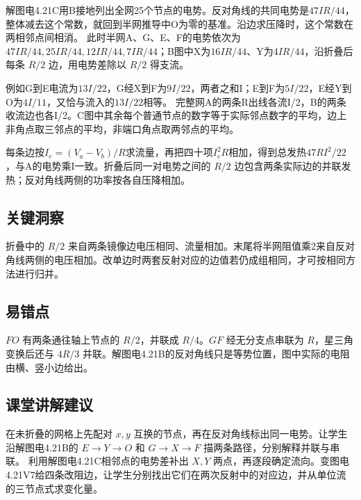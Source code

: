 \documentclass[UTF8,fontset=fandol,a4paper,11pt]{ctexart}
\begin{document}
解图电4.21C用B接地列出全网25个节点的电势。反对角线的共同电势是$47IR/44$，整体减去这个常数，就回到半网推导中O为零的基准。沿边求压降时，这个常数在两相邻点间相消。
此时半网A、G、E、F的电势依次为$47IR/44,25IR/44,12IR/44,7IR/44$；B图中X为$16IR/44$、Y为$4IR/44$，沿折叠后每条 $R/2$ 边，用电势差除以 $R/2$ 得支流。

例如G到E电流为$13I/22$，G经X到F为$9I/22$，两者之和I；E到F为$5I/22$，E经Y到O为$4I/11$，又恰与流入的$13I/22$相等。
完整网A的两条R出线各流I/2，B的两条收流边也各I/2。C图中其余每个普通节点的数字等于实际邻点数字的平均，边上非角点取三邻点的平均，非端口角点取两邻点的平均。

每条边按$I_e=(V_a-V_b)/R$求流量，再把四十项$I_e^2R$相加，得到总发热$47RI^2/22$，与A的电势乘I一致。折叠后同一对电势之间的 $R/2$ 边包含两条实际边的并联发热；反对角线两侧的功率按各自压降相加。




\subsection*{关键洞察}

折叠中的 $R/2$ 来自两条镜像边电压相同、流量相加。末尾将半网阻值乘2来自反对角线两侧的电压相加。改单边时两套反射对应的边值若仍成组相同，才可按相同方法进行归并。



\subsection*{易错点}

$FO$ 有两条通往轴上节点的 $R/2$，并联成 $R/4$。$GF$ 经无分支点串联为 $R$，星三角变换后还与 $4R/3$ 并联。解图电4.21B的反对角线只是等势位置，图中实际的电阻由横、竖小边给出。



\subsection*{课堂讲解建议}

在未折叠的网格上先配对 $x,y$ 互换的节点，再在反对角线标出同一电势。让学生沿解图电4.21B的 $E\to Y\to O$ 和 $G\to X\to F$ 描两条路径，分别解释并联与串联。
利用解图电4.21C相邻点的电势差补出 $X,Y$ 两点，再逐段确定流向。变图电4.21V7给四条改阻边，让学生分别找出它们在两次反射中的对应边，并从单位流的三节点式求变化量。
\end{document}
